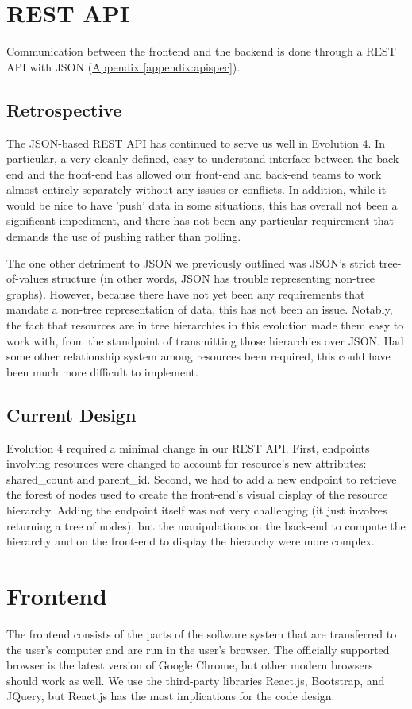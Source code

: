 \documentclass[12pt]{article}
\begin{document}
\section{REST API}
\label{sec:REST}
Communication between the frontend and the backend is done through a REST API with JSON (\hyperref[appendix:apispec]{Appendix \ref{appendix:apispec}}).

\subsection{Retrospective}
The JSON-based REST API has continued to serve us well in Evolution 4. In particular, a very cleanly defined, easy to understand interface between the back-end and the front-end has allowed our front-end and back-end teams to work almost entirely separately without any issues or conflicts. In addition, while it would be nice to have 'push' data in some situations, this has overall not been a significant impediment, and there has not been any particular requirement that demands the use of pushing rather than polling. 

The one other detriment to JSON we previously outlined was JSON's strict tree-of-values structure (in other words, JSON has trouble representing non-tree graphs). However, because there have not yet been any requirements that mandate a non-tree representation of data, this has not been an issue. Notably, the fact that resources are in tree hierarchies in this evolution made them easy to work with, from the standpoint of transmitting those hierarchies over JSON. Had some other relationship system among resources been required, this could have been much more difficult to implement. 

\subsection{Current Design}
Evolution 4 required a minimal change in our REST API. First, endpoints involving resources were changed to account for resource's new attributes: shared\_count and parent\_id. Second, we had to add a new endpoint to retrieve the forest of nodes used to create the front-end's visual display of the resource hierarchy. Adding the endpoint itself was not very challenging (it just involves returning a tree of nodes), but the manipulations on the back-end to compute the hierarchy and on the front-end to display the hierarchy were more complex. 


\section{Frontend}
\label{sec:Frontend}
The frontend consists of the parts of the software system that are transferred to the user's computer and are run in the user's browser. The officially supported browser is the latest version of Google Chrome, but other modern browsers should work as well. We use the third-party libraries React.js, Bootstrap, and JQuery, but React.js has the most implications for the code design.
\end{document}
